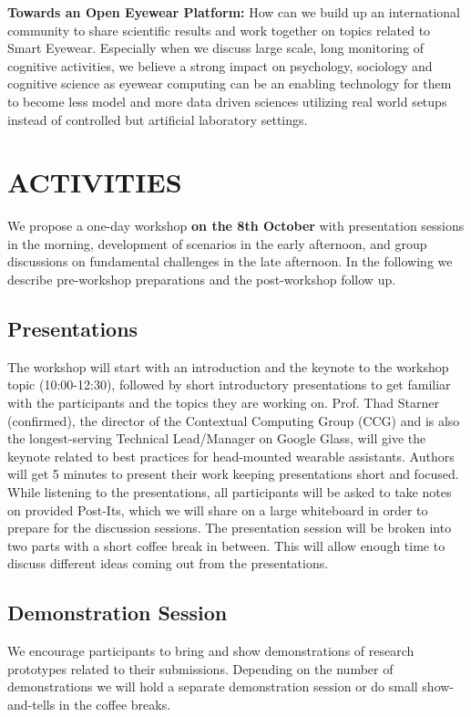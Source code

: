 \documentclass{sigchi-ext}
\begin{document}
{\bf Towards an Open Eyewear Platform:} How can we build up an international community to share scientific results and work together on topics related to Smart Eyewear. Especially when we discuss large scale, long monitoring of cognitive activities, we believe a strong impact on psychology, sociology and cognitive science as eyewear computing can be an enabling technology for them to  become less model and more data driven sciences utilizing real world setups instead of controlled but artificial laboratory settings.

\section{ACTIVITIES}
We propose a one-day workshop {\bf on the 8th October} with presentation sessions in the morning, development of scenarios in the early afternoon, and group discussions on fundamental challenges in the late afternoon. In the following we describe pre-workshop preparations and the post-workshop follow up.

\subsection{Presentations}
The workshop will start with an introduction and the keynote to the workshop topic (10:00-12:30), followed by short introductory presentations to get familiar with the participants and the topics they are working on. 
Prof. Thad Starner (confirmed), the director of the Contextual Computing Group (CCG) and is also the longest-serving Technical Lead/Manager on Google Glass, will give the keynote related to best practices for head-mounted wearable assistants.
Authors will get 5 minutes to present their work keeping presentations short and focused. While listening to the presentations, all participants will be asked to take notes on provided Post-Its, which we will share on a large whiteboard in order to prepare for the discussion sessions.
The presentation session will be broken into two parts with a short coffee break in between. This will allow enough time to discuss different ideas coming out from the presentations.

\subsection{Demonstration Session}
We encourage participants to bring and show demonstrations of research prototypes related to their submissions. Depending on the number of demonstrations we will hold a separate demonstration session or do small show-and-tells in the coffee breaks.
\end{document}
